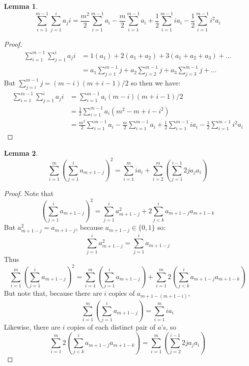 \documentclass[12pt]{amsart}
\newtheorem{lemma}{Lemma}[section]
\begin{document}
\begin{lemma}
\label{lem11}
	$$\sum_{i = 1}^{m-1} \sum_{j=1}^{i} a_j i
	= \frac{m^2}{2} \sum_{i=1}^{m-1} a_i
	- \frac{m}{2} \sum_{i=1}^{m-1} a_i
	+ \frac{1}{2} \sum_{i=1}^{m-1} i a_i
	- \frac{1}{2} \sum_{i=1}^{m-1} i^2 a_i$$
\end{lemma}
\begin{proof}
	\begin{align*}
		\sum_{i = 1}^{m-1} \sum_{j=1}^{i} a_j i &= 1(a_1) + 2(a_1 + a_2) + 3(a_1 + a_2 + a_3) + \dots \\
		&= a_1 \sum_{j=1}^{m-1} j + a_2 \sum_{j=2}^{m-1} j + a_3 \sum_{j=3}^{m-1} j + \dots
	\end{align*}
	But $\sum_{j=i}^{m-1} j = (m - i) (m + i - 1)/2$ so then we have:
	\begin{align*}
		\sum_{i = 1}^{m-1} \sum_{j=1}^{i} a_j i &= \sum_{i=1}^{m-1} a_i (m - i) (m + i - 1)/2 \\
									  &= \frac{1}{2} \sum_{i=1}^{m-1} a_i (m^2 - m + i - i^2) \\
									  &= \frac{m^2}{2} \sum_{i=1}^{m-1} a_i
	- \frac{m}{2} \sum_{i=1}^{m-1} a_i
	+ \frac{1}{2} \sum_{i=1}^{m-1} i a_i
	- \frac{1}{2} \sum_{i=1}^{m-1} i^2 a_i
	\end{align*}
\end{proof}

\begin{lemma}
\label{lem12}
	$$\sum_{i=1}^{m} \left( \sum_{j=1}^{i} a_{m+1-j} \right)^2 = \sum_{i=1}^{m} i a_i  + \sum_{i=2}^{m} \left( \sum_{j=1}^{i-1} 2 j a_j a_i \right)$$
\end{lemma}
\begin{proof}
	Note that 
	$$\left( \sum_{j=1}^{i} a_{m+1-j} \right)^2 = \sum_{j=1}^{i} a_{m+1-j}^2 + 2 \sum_{j<k}^{i} a_{m+1-j} a_{m+1-k}$$
	But $a_{m+1-j}^2 = a_{m+1-j}$, because $a_{m+1-j} \in \{ 0, 1 \}$ so:
	$$\sum_{j=1}^{i} a_{m+1-j}^2 = \sum_{j=1}^{i} a_{m+1-j}$$
	Thus 
	$$\sum_{i=1}^{m} \left( \sum_{j=1}^{i} a_{m+1-j} \right)^2 = 
		   \sum_{i=1}^{m} \left( \sum_{j=1}^{i} a_{m+1-j}                     \right)
		+ \sum_{i=1}^{m} 2 \left( \sum_{j<k}^{i} a_{m+1-j} a_{m+1-k} \right)
	$$
	But note that, because there are $i$ copies of $a_{m+1-(m+1-i)}$,
	$$\sum_{i=1}^{m} \left( \sum_{j=1}^{i} a_{m+1-j} \right) = \sum_{i=1}^{m} i a_i$$
	Likewise, there are $i$ copies of each distinct pair of $a$'s, so
	$$\sum_{i=1}^{m} 2 \left( \sum_{j<k}^{i} a_{m+1-j} a_{m+1-k} \right) = \sum_{i=1}^{m} \left( \sum_{j=2}^{i-1} 2 j a_j a_i \right)$$
\end{proof} 
\end{document}
